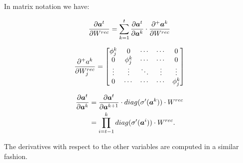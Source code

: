 \begin{frame}
	In matrix notation we have:
	
	\begin{equation}
	\frac{\partial \boldsymbol{a}^t}{\partial W^{rec}} = \sum_{k=1}^t \frac{\partial \boldsymbol{a}^t}{\partial \boldsymbol{a}^k} \cdot \frac{\partial^+ \boldsymbol{a}^k}{\partial W^{rec}}
	\end{equation}
	
	
	\begin{equation}
	\frac{\partial^+ a^{k}}{\partial W_j^{rec}} =
	\begin{bmatrix}
	\phi_j^{k}    & 0                & \cdots      & \cdots       & 0  \\
	0               & \phi_j^{k}     & \cdots      & \cdots       & 0  \\
	\vdots          & \vdots           & \ddots      & \vdots       &\vdots\\
	0               & \cdots           & \cdots      & \cdots       & \phi^{k}_{j}
	\end{bmatrix}
	\end{equation}
	
	\begin{align}
	\frac{\partial \boldsymbol{a}^t}{\partial \boldsymbol{a}^k} &= \frac{\partial \boldsymbol{a}^t}{\partial \boldsymbol{a}^{k+1}} \cdot diag(\sigma'(\boldsymbol{a}^k)) \cdot W^{rec} \\
	&= \prod_{i=t-1}^{k} diag(\sigma'(\boldsymbol{a}^i)) \cdot W^{rec}
	\label{rnn_delta}.
	\end{align}
	
	The derivatives with respect to the other variables are computed in a similar fashion.

	
\end{frame}

